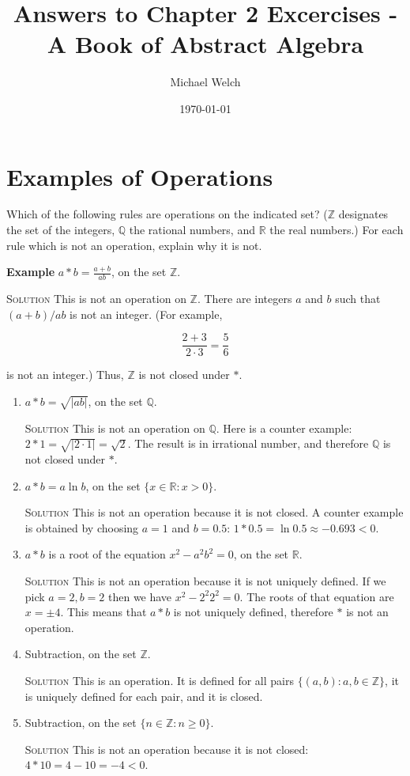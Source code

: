 \documentclass[draft,twoside]{amsart}
\newcommand{\Rationals}{\mathbb{Q}{}}
\newcommand{\Reals}{\mathbb{R}{}}
\newcommand{\Integers}{\mathbb{Z}{}}
\newcommand{\Solution}{\textsc{Solution}\xspace}
\newcommand{\brk}{\vspace{5pt}}
\newcommand{\noindsol}{\noindent\Solution}
\begin{document}
\title{Answers to Chapter 2 Excercises - A Book of Abstract Algebra}
\author{Michael Welch}
\date{\today}
\maketitle

\section{Examples of Operations}
Which of the following rules are operations on the indicated set?  ($\Integers$
designates the set of the integers, $\Rationals$ the rational numbers, and
$\Reals$ the real numbers.) For each rule which is not an operation, explain
why it is not. 

\textbf{Example} $a * b = \displaystyle \frac{a + b}{ab}$, on the set
$\Integers$. 

\Solution This is not an operation on  $\Integers$. There are integers
$a$ and $b$ such that $(a+b)/ab$ is not an integer. (For example,

\[
\frac{2+3}{2 \cdot 3} = \frac{5}{6}
\]

is not an integer.) Thus, $\Integers$ is not closed under $*$. 

\begin{enumerate}

\item $a*b = \sqrt{|ab|}$, on the set $\Rationals$. 

\brk
\noindsol This is not an operation on $\Rationals$. Here is a counter
example: $2*1 = \sqrt{|2 \cdot 1|} = \sqrt{2}$. The result is in irrational
number, and therefore $\Rationals$ is not closed under $*$.
\brk


\item $a*b = a \ln b$, on the set $\{x \in \Reals  : x > 0\}$. 

\brk
\noindsol This is not an operation because it is not closed. A
counter example is obtained by choosing $a=1$ and $b=0.5$: $1 * 0.5 = \ln 0.5
\approx -0.693 < 0$. 
\brk


\item $a*b$ is a root of the equation $x^2 - a^2 b^2 = 0$, on the set $\Reals$.

\brk
\noindsol This is not an operation because it is not uniquely defined.
If we pick $a=2,b=2$ then we have $x^2 - 2^2 2^2 = 0$. The roots of that
equation are $x = \pm 4$. This means that $a*b$ is not uniquely defined, 
therefore $*$ is not an operation.
\brk

\item Subtraction, on the set $\Integers$.

\brk
\noindsol This is an operation. It is defined for all pairs 
$\{(a,b) : a,b \in \Integers\}$, it is uniquely defined for each pair, and it
is closed.
\brk

\item Subtraction, on the set $\{ n \in \Integers : n \ge 0\}$.

\brk
\noindsol This is not an operation because it is not closed:
$4*10 = 4 - 10 = -4 < 0$.

\end{enumerate}
\end{document}
